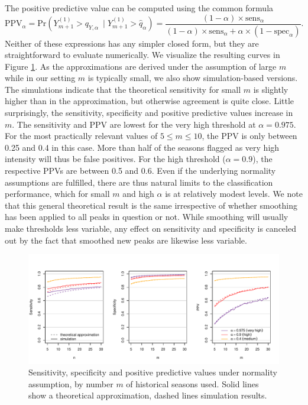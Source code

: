 \documentclass{article}
\begin{document}
The positive predictive value can be computed using the common formula
\begin{equation}
\text{PPV}_\alpha = \text{Pr}(Y_{m + 1}^{(1)} > q_{Y, \alpha} \ \mid Y_{m + 1}^{(1)} > \hat{q}_\alpha) = \frac{(1 - \alpha) \times \text{sens}_\alpha}{(1 - \alpha) \times \text{sens}_\alpha + \alpha \times (1 - \text{spec}_\alpha)}.
\label{eq:ppv}
\end{equation}
Neither of these expressions has any simpler closed form, but they are straightforward to evaluate numerically. We visualize the resulting curves in Figure \ref{fig:sens_spec_ana}. As the approximations are derived under the assumption of large $m$ while in our setting $m$ is typically small, we also show simulation-based versions. The simulations indicate that the theoretical sensitivity for small $m$ is slightly higher than in the approximation, but otherwise agreement is quite close. Little surprisingly, the sensitivity, specificity and positive predictive values increase in $m$. The sensitivity and PPV are lowest for the very high threshold at $\alpha = 0.975$. For the most practically relevant values of $5 \leq m \leq 10$, the PPV is only between 0.25 and 0.4 in this case. More than half of the seasons flagged as very high intensity will thus be false positives. For the high threshold ($\alpha = 0.9$), the respective PPVs are between 0.5 and 0.6. Even if the underlying normality assumptions are fulfilled, there are thus natural limits to the classification performance, which for small $m$ and high $\alpha$ is at relatively modest levels. We note that this general theoretical result is the same irrespective of
 whether smoothing has been applied to all peaks in question or not. While smoothing will usually make thresholds less variable, any effect on sensitivity and specificity is canceled out by the fact that smoothed new peaks are likewise less variable.

\begin{figure}
\begin{center}
\includegraphics[scale=0.75]{figure/analytical_sens_spec.pdf}
\end{center}

\vspace{-10mm}

\caption{Sensitivity, specificity and positive predictive values under normality assumption, by number $m$ of historical seasons used. Solid lines show a theoretical approximation, dashed lines simulation results.}
\label{fig:sens_spec_ana}
\end{figure}
\end{document}
